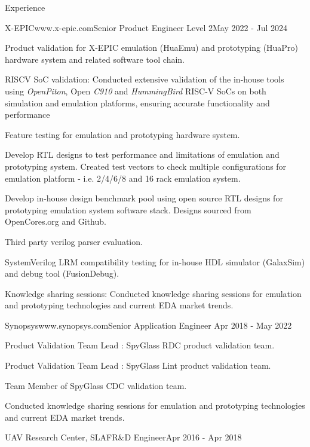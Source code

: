 \documentclass[
11pt, %
]{./assets/resume} %
\begin{document}
\begin{rSection}{Experience}
	\begin{rSubsectionX}{X-EPIC}{www.x-epic.com}{Senior Product Engineer Level 2}{May 2022 - Jul 2024}
		\item Product validation for X-EPIC emulation (HuaEmu) and prototyping (HuaPro) hardware system and related software tool chain.
		\item RISCV SoC validation: Conducted extensive validation of the in-house tools using \textit{OpenPiton}, Open \textit{C910} and \textit{HummingBird} RISC-V SoCs on both simulation and emulation platforms, ensuring accurate functionality and performance 
		\item Feature testing for emulation and prototyping hardware system.
		\item Develop RTL designs to test performance and limitations of emulation and prototyping system. Created test vectors to check multiple configurations for emulation platform - i.e. 2/4/6/8 and 16 rack emulation system.
		\item Develop in-house design benchmark pool using open source RTL designs for prototyping emulation system software stack. Designs sourced from OpenCores.org and Github.
		\item Third party verilog parser evaluation.
		\item SystemVerilog LRM compatibility testing for in-house HDL simulator (GalaxSim) and debug tool (FusionDebug).
		\item Knowledge sharing sessions: Conducted knowledge sharing sessions for emulation and prototyping technologies and current EDA market trends.
	\end{rSubsectionX}
	\begin{rSubsectionX}{Synopsys}{www.synopsys.com}{Senior Application Engineer }{Apr 2018 - May 2022}
		\item Product Validation Team Lead : SpyGlass RDC product validation team.
		\item Product Validation Team Lead : SpyGlass Lint product validation team.
		\item Team Member of SpyGlass CDC validation team.
		\item Conducted knowledge sharing sessions for emulation and prototyping technologies and current EDA market trends.
	\end{rSubsectionX}
	\begin{rSubsectionX}{UAV Research Center, SLAF}{}{R\&D Engineer}{Apr 2016 - Apr 2018}

\end{rSubsectionX}
\end{rSection}
\end{document}
